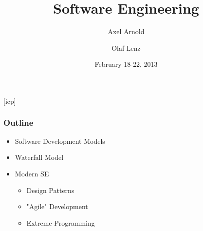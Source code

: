 \documentclass{slides}
\begin{document}
\graphicspath{{figures/}}

\title[Software Engineering]{\Large Software Engineering}

\author[A. Arnold and O. Lenz]{Axel Arnold \and Olaf Lenz} 
\date{February 18-22, 2013}

\begin{frame}
  \titlepage
\end {frame}
[icp]

\begin{frame}
  \frametitle{Outline}
  \begin{itemize}
  \item Software Development Models
  \item Waterfall Model
  \item Modern SE
    \begin{itemize}
    \item Design Patterns
    \item "Agile" Development
    \item Extreme Programming
    \end{itemize}
  \end{itemize}
\end{frame}
\end{document}
